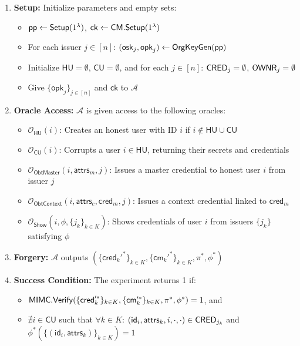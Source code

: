 \begin{enumerate}
    \item \textbf{Setup:} Initialize parameters and empty sets:
    \begin{itemize}
        \item $\mathsf{pp} \gets \mathsf{Setup}(1^\lambda)$, $\mathsf{ck} \gets \mathsf{CM.Setup}(1^\lambda)$
        \item For each issuer $j \in [n]$: $(\mathsf{osk}_j, \mathsf{opk}_j) \gets \mathsf{OrgKeyGen}(\mathsf{pp})$
        \item Initialize $\mathsf{HU} = \emptyset$, $\mathsf{CU} = \emptyset$, and for each $j \in [n]$: $\mathsf{CRED}_j = \emptyset$, $\mathsf{OWNR}_j = \emptyset$
        \item Give $\{\mathsf{opk}_j\}_{j \in [n]}$ and $\mathsf{ck}$ to $\mathcal{A}$
    \end{itemize}
    
    \item \textbf{Oracle Access:} $\mathcal{A}$ is given access to the following oracles:
    \begin{itemize}
        \item $\mathcal{O}_{\mathsf{HU}}(i)$: Creates an honest user with ID $i$ if $i \notin \mathsf{HU} \cup \mathsf{CU}$
        \item $\mathcal{O}_{\mathsf{CU}}(i)$: Corrupts a user $i \in \mathsf{HU}$, returning their secrets and credentials
        \item $\mathcal{O}_{\mathsf{ObtMaster}}(i, \mathsf{attrs}_m, j)$: Issues a master credential to honest user $i$ from issuer $j$
        \item $\mathcal{O}_{\mathsf{ObtContext}}(i, \mathsf{attrs}_c, \mathsf{cred}_m, j)$: Issues a context credential linked to $\mathsf{cred}_m$
        \item $\mathcal{O}_{\mathsf{Show}}(i, \phi, \{j_k\}_{k \in K})$: Shows credentials of user $i$ from issuers $\{j_k\}$ satisfying $\phi$
    \end{itemize}
    
    \item \textbf{Forgery:} $\mathcal{A}$ outputs $(\{\mathsf{cred}_k'^*\}_{k \in K}, \{\mathsf{cm}_k'^*\}_{k \in K}, \pi^*, \phi^*)$
    
    \item \textbf{Success Condition:} The experiment returns 1 if:
    \begin{itemize}
        \item $\mathsf{MIMC.Verify}(\{\mathsf{cred}_k'^*\}_{k \in K}, \{\mathsf{cm}_k'^*\}_{k \in K}, \pi^*, \phi^*) = 1$, and
        \item $\nexists i \in \mathsf{CU}$ such that $\forall k \in K$: $(\mathsf{id}_i, \mathsf{attrs}_k, i, \cdot, \cdot) \in \mathsf{CRED}_{j_k}$ and $\phi^*(\{(\mathsf{id}_i, \mathsf{attrs}_k)\}_{k \in K}) = 1$
    \end{itemize}
\end{enumerate}

